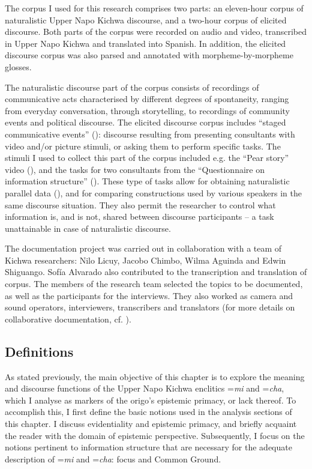 \documentclass[output=paper]{langscibook}
\begin{document}
The corpus I used for this research comprises two parts: an eleven-hour corpus of naturalistic Upper Napo Kichwa discourse, and a two-hour corpus of elicited discourse. Both parts of the corpus were recorded on audio and video, transcribed in Upper Napo Kichwa and translated into Spanish. In addition, the elicited discourse corpus was also parsed and annotated with morpheme-by-morpheme glosses.

The naturalistic discourse part of the corpus consists of recordings of communicative acts characterised by different degrees of spontaneity, ranging from everyday conversation, through storytelling, to recordings of community events and political discourse. The elicited discourse corpus includes “staged communicative events” (\citealt{Himmelmann2006}): discourse resulting from presenting consultants with video and/or picture stimuli, or asking them to perform specific tasks. The stimuli I used to collect this part of the corpus included e.g. the “Pear story” video (\citealt{Chafe1980}), and the tasks for two consultants from the “Questionnaire on information structure” (\citealt{Skopeteas2006}). These type of tasks allow for obtaining naturalistic parallel data (\citealt[137]{SanRoque2012}), and for comparing constructions used by various speakers in the same discourse situation. They also permit the researcher to control what information is, and is not, shared between discourse participants – a task unattainable in case of naturalistic discourse.

The documentation project was carried out in collaboration with a team of Kichwa researchers: Nilo Licuy, Jacobo Chimbo, Wilma Aguinda and Edwin Shiguango. Sofía Alvarado also contributed to the transcription and translation of corpus. The members of the research team selected the topics to be documented, as well as the participants for the interviews. They also worked as camera and sound operators, interviewers, transcribers and translators (for more details on collaborative documentation, cf. \citealt[sec. 1.3.3]{Grzech2016a}).


\subsection{Definitions}\label{s:kg1-3}

As stated previously, the main objective of this chapter is to explore the meaning and discourse functions of the Upper Napo Kichwa enclitics =\textit{mi} and =\textit{cha}, which I analyse as markers of the origo’s epistemic primacy, or lack thereof. To accomplish this, I first define the basic notions used in the analysis sections of this chapter. I discuss evidentiality and epistemic primacy, and briefly acquaint the reader with the domain of epistemic perspective. Subsequently, I focus on the notions pertinent to information structure that are necessary for the adequate description of =\textit{mi} and =\textit{cha}: focus and Common Ground.
\end{document}
